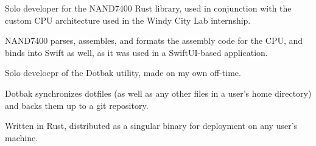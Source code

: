 \documentclass[]{deedy-resume-reversed}
\begin{document}
\begin{minipage}[t]{0.60\textwidth}
	\begin{tightemize}
		\item Solo developer for the NAND7400 Rust library, used in conjunction with the custom CPU architecture used in
		the Windy City Lab internship.
		\item NAND7400 parses, assembles, and formats the assembly code for the CPU, and binds into Swift as well, as it
		was used in a SwiftUI-based application.
	\end{tightemize}
	\sectionsep

	\begin{tightemize}
		\item Solo develoepr of the Dotbak utility, made on my own off-time.
		\item Dotbak synchronizes dotfiles (as well as any other files in a user's home directory) and backs them up to
		a git repository.
		\item Written in Rust, distributed as a singular binary for deployment on any user's machine.
	\end{tightemize}
	\sectionsep







\end{minipage}
\end{document}
